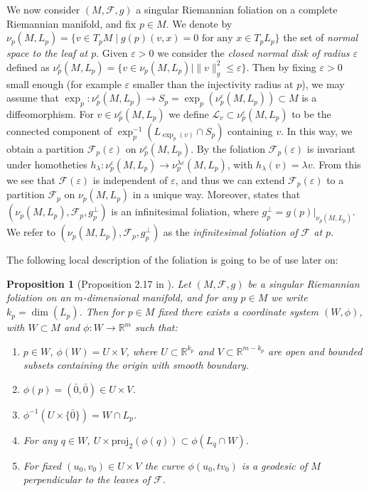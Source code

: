 \documentclass[12pt,a4paper,reqno]{amsart}
\newtheorem{prop}[theorem]{Proposition}
\theoremstyle{definition}
\numberwithin{equation}{section}
\newcommand{\fol}{\mathcal{F}}
\newcommand{\R}{\mathbb{R}} %
\DeclareMathOperator{\expo}{exp}
\begin{document}
We now consider $(M,\fol,g)$ a singular Riemannian foliation on a complete Riemannian manifold, and fix $p\in M$. We denote by $\nu_p(M,L_p)=  \{v\in T_p M\mid g(p)(v,x) =0\mbox{ for any } x\in T_p L_p\}$ the set of \emph{normal space to the leaf at $p$}. Given $\varepsilon>0$ we consider the \emph{closed normal disk of radius $\varepsilon$} defined as $\nu_p^\varepsilon(M,L_p) =\{v\in \nu_p(M,L_p)\mid \|v\|^2_g \leq \varepsilon\}$. Then by fixing $\varepsilon>0$ small enough (for example $\varepsilon$ smaller than the injectivity radius at $p$), we may assume that $\expo_p\colon \nu_p^\varepsilon(M,L_p)\to S_p = \exp_p(\nu_p^\varepsilon(M,L_p))\subset M$ is a diffeomorphism. For $v\in \nu_p^\varepsilon(M,L_p)$ we define $\mathcal{L}_v\subset \nu_p^\varepsilon(M,L_p)$ to be the connected component of \linebreak$\expo_p^{-1}(L_{\expo_p(v)}\cap S_p)$ containing $v$. In this way, we obtain a partition $\fol_p(\varepsilon)$ on $\nu_p^\varepsilon(M,L_p)$. By \cite[Lemma 6.2]{Molino} the foliation $\fol_{p}(\varepsilon) $ is invariant under homotheties $h_{\lambda}\colon \nu_p^\varepsilon(M,L_p)\to \nu_p^{\lambda\varepsilon}(M,L_p)$, with $h_{\lambda}(v) = \lambda v$. From this we see that $\fol(\varepsilon)$ is independent of $\varepsilon$, and thus we can extend  $\fol_p(\varepsilon)$ to a partition $\fol_p$ on $\nu_p(M,L_p)$ in a unique way. Moreover, \cite[Proposition 6.5]{Molino} states that $(\nu_p(M,L_p),\fol_p,g_p^\perp)$ is an infinitesimal foliation, where $g_p^\perp = g(p)|_{\nu_p(M,L_p)}$. We refer to $(\nu_p(M,L_p),\fol_p,g_p^\perp)$ as the \emph{infinitesimal foliation of $\fol$ at $p$}. 

The following local description of the foliation is going to be of use later on:

\begin{prop}[Proposition 2.17 in \cite{Radeschi2017}]\th\label{P: Plaque charts}
Let $(M,\fol,g)$ be a singular Riemannian foliation on an $m$-dimensional manifold, and for  any $p \in M$ we write  $k_p = \dim(L_p)$. Then  for $p\in M$ fixed there exists a coordinate system $(W, \phi)$, with $W\subset M$ and $\phi\colon W\to \R^m$ such that:
\begin{enumerate}[(1)]
\item $p \in W$, $\phi(W) = U \times V$, where $U \subset \R^{k_p}$ and $V \subset \R^{m-k_p}$ are open and bounded subsets containing the origin with smooth boundary.
\item $\phi(p) = (\bar{0},\bar{0})\in U\times V$.
\item $\phi^{-1}(U\times\{\bar{0}\}) = W\cap L_p$.
\item For any $q \in W$, $U \times \mathrm{proj}_2(\phi(q))\subset  \phi(L_{q} \cap W )$.
\item For fixed $(u_0,v_0)\in U\times V$ the curve $\phi(u_0,tv_0)$ is a geodesic of $M$ perpendicular to the leaves of $\fol$.
\end{enumerate}
\end{prop}
\end{document}
